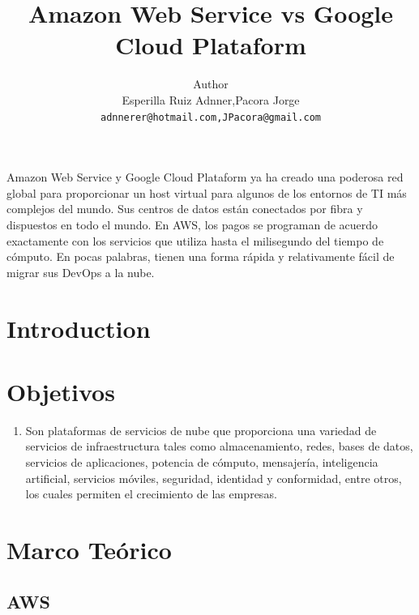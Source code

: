 \documentclass[11pt]{article}
\title{Amazon Web Service vs Google Cloud Plataform}
\author{Author \\
Esperilla Ruiz Adnner,Pacora Jorge \\
  {\tt adnnerer@hotmail.com,JPacora@gmail.com} \\}
\date{}
\begin{document}
\maketitle
\begin{abstract}
    
\end{abstract}
Amazon Web Service y Google Cloud Plataform ya ha creado una poderosa red global para proporcionar un host virtual para algunos de los entornos de TI más complejos del mundo. Sus centros de datos están conectados por fibra y dispuestos en todo el mundo. En AWS, los pagos se programan de acuerdo exactamente con los servicios que utiliza hasta el milisegundo del tiempo de cómputo. En pocas palabras, tienen una forma rápida y relativamente fácil de migrar sus DevOps a la nube.

\section{Introduction}


\section{Objetivos}
\begin{enumerate}
    \item Son plataformas de servicios de nube que proporciona una variedad de servicios de infraestructura tales como almacenamiento, redes, bases de datos, servicios de aplicaciones, potencia de cómputo, mensajería, inteligencia artificial, servicios móviles, seguridad, identidad y conformidad, entre otros, los cuales permiten el crecimiento de las empresas. 
\end{enumerate}


\section{Marco Teórico}

\subsection{AWS}
\end{document}
